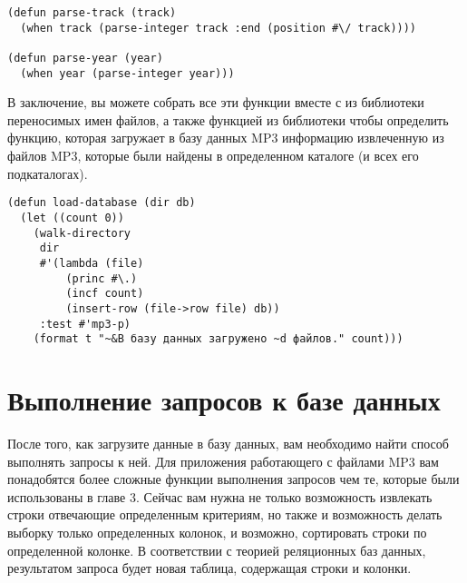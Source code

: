 \begin{lstlisting}
(defun parse-track (track)
  (when track (parse-integer track :end (position #\/ track))))

(defun parse-year (year)
  (when year (parse-integer year)))
\end{lstlisting}

В заключение, вы можете собрать все эти функции вместе с  из
библиотеки переносимых имен файлов, а также функцией  из библиотеки
 чтобы определить функцию, которая загружает в базу данных MP3 информацию
извлеченную из файлов MP3, которые были найдены в определенном каталоге (и всех его
подкаталогах).

\begin{lstlisting}
(defun load-database (dir db)
  (let ((count 0))
    (walk-directory 
     dir 
     #'(lambda (file)
         (princ #\.)
         (incf count)
         (insert-row (file->row file) db))
     :test #'mp3-p)
    (format t "~&В базу данных загружено ~d файлов." count)))
\end{lstlisting}

\section{Выполнение запросов к базе данных}

После того, как загрузите данные в базу данных, вам необходимо найти способ выполнять
запросы к ней.  Для приложения работающего с файлами MP3 вам понадобятся более сложные
функции выполнения запросов чем те, которые были использованы в главе 3.  Сейчас вам нужна
не только возможность извлекать строки отвечающие определенным критериям, но также и
возможность делать выборку только определенных колонок, и возможно, сортировать строки по
определенной колонке.  В соответствии с теорией реляционных баз данных, результатом
запроса будет новая таблица, содержащая строки и колонки.

